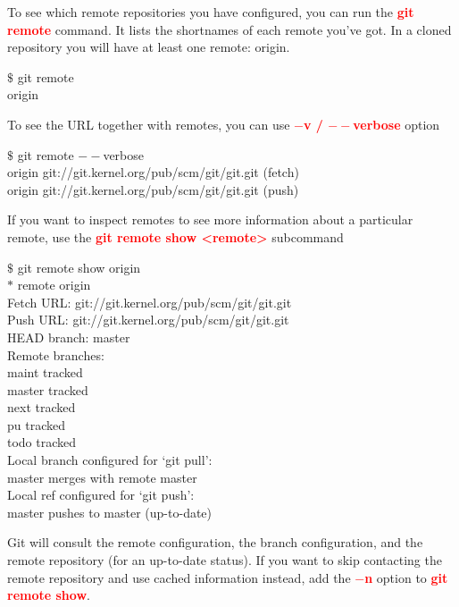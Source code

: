 \documentclass[12pt,a4paper]{article}
\begin{document}
\cite{narębski2016mastering} To see which remote repositories you have configured, you can run the \textcolor{red}{\bf git remote} command. It lists the shortnames of each remote you've got. In a cloned repository you will have at least one remote: origin.
\begin{tcolorbox}[colback=green!5,colframe=green!40!black,title= ]
$\$$ git remote \\
origin
\end{tcolorbox}

To see the URL together with remotes, you can use \textcolor{red}{\bf $-$v / $--$verbose} option
\begin{tcolorbox}[colback=green!5,colframe=green!40!black,title= ]
$\$$ git remote $--$verbose \\
origin git://git.kernel.org/pub/scm/git/git.git (fetch) \\
origin git://git.kernel.org/pub/scm/git/git.git (push)
\end{tcolorbox}

If you want to inspect remotes to see more information about a particular remote, use the \textcolor{red}{\bf git remote show <remote>} subcommand
\begin{tcolorbox}[colback=green!5,colframe=green!40!black,title= ]
$\$$ git remote show origin \\
$\ast$ remote origin \\
Fetch URL: git://git.kernel.org/pub/scm/git/git.git \\
Push URL: git://git.kernel.org/pub/scm/git/git.git \\
HEAD branch: master \\
Remote branches: \\
maint tracked \\
master tracked \\
next tracked \\
pu tracked \\
todo tracked \\
Local branch configured for `git pull': \\
master merges with remote master \\
Local ref configured for `git push': \\
master pushes to master (up-to-date)
\end{tcolorbox}

Git will consult the remote configuration, the branch configuration, and the remote repository (for an up-to-date status). If you want to skip contacting the remote repository and use cached information instead, add the \textcolor{red}{\bf $-$n} option to \textcolor{red}{\bf git remote show}.
\end{document}
